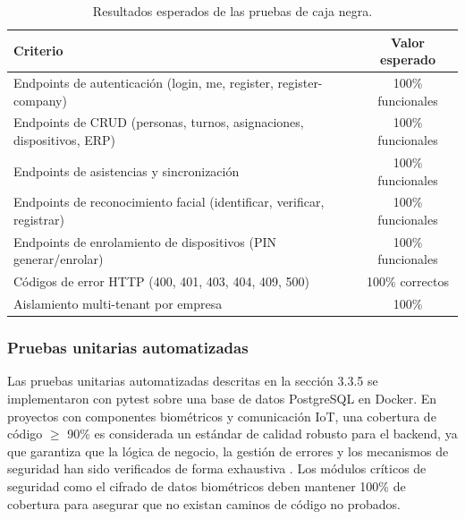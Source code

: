 \documentclass{iccmemoria}
\begin{document}
\begin{table}[H]
\centering
\small
\begin{tabular}{|p{8cm}|c|}
\hline
\textbf{Criterio} & \textbf{Valor esperado} \\
\hline
Endpoints de autenticación (login, me, register, register-company) & 100\% funcionales \\
Endpoints de CRUD (personas, turnos, asignaciones, dispositivos, ERP) & 100\% funcionales \\
Endpoints de asistencias y sincronización & 100\% funcionales \\
Endpoints de reconocimiento facial (identificar, verificar, registrar) & 100\% funcionales \\
Endpoints de enrolamiento de dispositivos (PIN generar/enrolar) & 100\% funcionales \\
Códigos de error HTTP (400, 401, 403, 404, 409, 500) & 100\% correctos \\
Aislamiento multi-tenant por empresa & 100\% \\
\hline
\end{tabular}
\caption{Resultados esperados de las pruebas de caja negra.}
\label{tab:esperado_cajanegra}
\end{table}

\subsubsection{Pruebas unitarias automatizadas}
Las pruebas unitarias automatizadas descritas en la sección 3.3.5 se implementaron con pytest sobre una base de datos PostgreSQL en Docker. En proyectos con componentes biométricos y comunicación IoT, una cobertura de código $\geq$ 90\% es considerada un estándar de calidad robusto para el backend, ya que garantiza que la lógica de negocio, la gestión de errores y los mecanismos de seguridad han sido verificados de forma exhaustiva \cite{pressman2015}. Los módulos críticos de seguridad como el cifrado de datos biométricos deben mantener 100\% de cobertura para asegurar que no existan caminos de código no probados.
\end{document}
